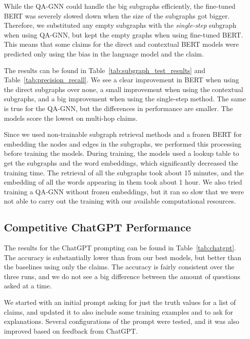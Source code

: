 \documentclass[11pt]{article}
\begin{document}


While the QA-GNN could handle the big subgraphs efficiently, the fine-tuned BERT was severely slowed down when the size of the subgraphs got bigger. Therefore, we substituted any empty subgraphs with the \emph{single-step} subgraph when using QA-GNN, but kept the empty graphs when using fine-tuned BERT. This means that some claims for the direct and contextual BERT models were predicted only using the bias in the language model and the claim.



The results can be found in Table~\ref{tab:subgraph_test_results} and Table~\ref{tab:precision_recall}. We see a clear improvement in BERT when using the direct subgraphs over none, a small improvement when using the contextual subgraphs, and a big improvement when using the single-step method. The same is true for the QA-GNN, but the differences in performance are smaller. The models score the lowest on multi-hop claims.

Since we used non-trainable subgraph retrieval methods and a frozen BERT for embedding the nodes and edges in the subgraphs, we performed this processing before training the models. During training, the models used a lookup table to get the subgraphs and the word embeddings, which significantly decreased the training time. The retrieval of all the subgraphs took about 15 minutes, and the embedding of all the words appearing in them took about 1 hour. We also tried training a QA-GNN without frozen embeddings, but it ran so slow that we were not able to carry out the training with our available computational resources.

\subsection{Competitive ChatGPT Performance}



The results for the ChatGPT prompting can be found in Table~\ref{tab:chatgpt}. The accuracy is substantially lower than from our best models, but better than the baselines using only the claims. The accuracy is fairly consistent over the three runs, and we do not see a big difference between the amount of questions asked at a time.

We started with an initial prompt asking for just the truth values for a list of claims, and updated it to also include some training examples and to ask for explanations. Several configurations of the prompt were tested, and it was also improved based on feedback from ChatGPT.
\end{document}
